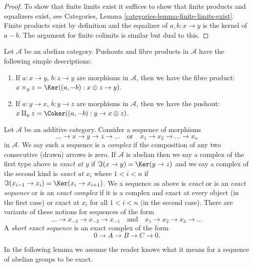 \begin{proof}
To show that finite limits exist it suffices to show
that finite products and equalizers exist, see
Categories, Lemma \ref{categories-lemma-finite-limits-exist}.
Finite products exist
by definition and the equalizer of $a, b : x \to y$ is
the kernel of $a - b$. The argument for finite colimits
is similar but dual to this.
\end{proof}

\begin{example}
\label{example-fibre-product-pushouts}
Let $\mathcal{A}$ be an abelian category.
Pushouts and fibre products in $\mathcal{A}$ have the following
simple descriptions:
\begin{enumerate}
\item If $a : x \to y$, $b : z \to y$ are morphisms in $\mathcal{A}$, then
we have the fibre product:
$x \times_y z = \Ker((a, -b) : x \oplus z \to y)$.
\item If $a : y \to x$, $b : y \to z$ are morphisms in $\mathcal{A}$, then
we have the pushout:
$x \amalg_y z = \Coker((a, -b) : y \to x \oplus z)$.
\end{enumerate}
\end{example}

\begin{definition}
\label{definition-exact}
Let $\mathcal{A}$ be an additive category. Consider a sequence of morphisms
$$
\ldots \to x \to y \to z \to \ldots
\quad\text{or}\quad
x_1 \to x_2 \to \ldots \to x_n
$$
in $\mathcal{A}$. We say such a sequence is a {\it complex} if the
composition of any two consecutive (drawn) arrows is zero.
If $\mathcal{A}$ is abelian then we say a complex of the first
type above is {\it exact at $y$} if $\Im(x \to y) = \Ker(y \to z)$
and we say a complex of the second kind is {\it exact at $x_i$}
where $1 < i < n$ if
$\Im(x_{i - 1} \to x_i) = \Ker(x_i \to x_{i + 1})$. We a
sequence as above is {\it exact} or is an {\it exact sequence} or is an
{\it exact complex} if it is a complex and exact at every object (in
the first case) or exact at $x_i$ for all $1 < i < n$ (in the second case).
There are variants of these notions for sequences of the form
$$
\ldots \to x_{-3} \to x_{-2} \to x_{-1}
\quad\text{and}\quad
x_1 \to x_2 \to x_3 \to \ldots
$$
A {\it short exact sequence} is an exact complex of the form
$$
0 \to A  \to B \to C \to 0.
$$
\end{definition}

\noindent
In the following lemma we assume the reader knows what it means
for a sequence of abelian groups to be exact.

